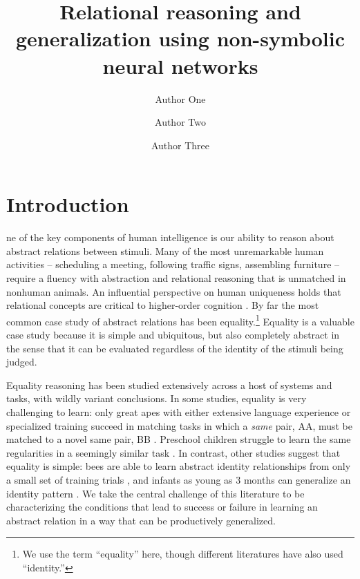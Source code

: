 \documentclass[9pt,twocolumn,twoside,lineno]{pnas-new}
\title{Relational reasoning and generalization using non-symbolic neural networks}
\author[a,c,1]{Author One}
\author[b,1,2]{Author Two}
\author[a]{Author Three}
\affil[a]{Affiliation One}
\affil[b]{Affiliation Two}
\affil[c]{Affiliation Three}
\begin{document}
\maketitle
\thispagestyle{firststyle}


\section{Introduction}\label{sec:introduction}

ne of the key components of human intelligence is our ability to reason about abstract relations between stimuli. Many of the most unremarkable human activities -- scheduling a meeting, following traffic signs, assembling furniture -- require a fluency with abstraction and relational reasoning that is unmatched in nonhuman animals. An influential perspective on human uniqueness holds that relational concepts are critical to higher-order cognition \citep[e.g.,][]{Gentner:2003}. By far the most common case study of abstract relations has been equality.\footnote{We use the term ``equality'' here, though different literatures have also used ``identity.''} Equality is a valuable case study because it is simple and ubiquitous, but also completely abstract in the sense that it can be evaluated regardless of the identity of the stimuli being judged.

Equality reasoning has been studied extensively across a host of systems and tasks, with wildly variant conclusions. In some studies, equality is very challenging to learn: only great apes with either extensive language experience or specialized training succeed in matching tasks in which a \emph{same} pair, AA, must be matched to a novel same pair, BB \citep{Premack:1983,thompson:2001}. Preschool children struggle to learn the same regularities in a seemingly similar task \citep{walker:2016}. In contrast, other studies suggest that equality is simple: bees are able to learn abstract identity relationships from only a small set of training trials \citep{avargues:2011}, and infants as young as 3 months can generalize an identity pattern \citep{anderson:2018}. We take the central challenge of this literature to be characterizing the conditions that lead to success or failure in learning an abstract relation in a way that can be productively generalized.
\end{document}
